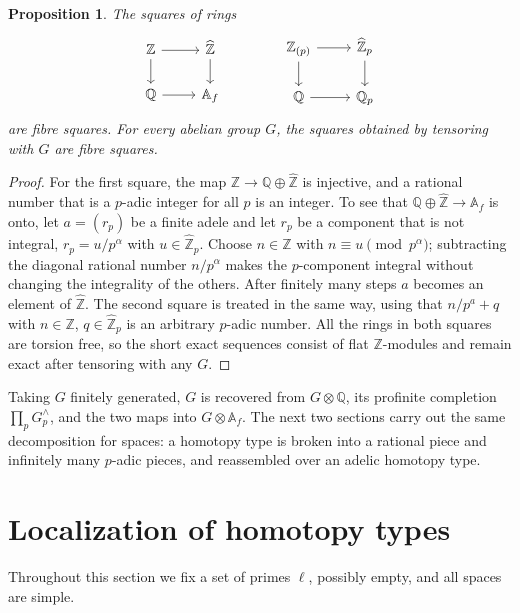 \documentclass[11pt]{amsart}
\theoremstyle{plain}
\newtheorem{proposition}[theorem]{Proposition}
\theoremstyle{definition}
\numberwithin{equation}{section}
\newcommand{\Z}{\mathbb{Z}}
\newcommand{\Q}{\mathbb{Q}}
\newcommand{\Zhat}{\widehat{\mathbb{Z}}}
\newcommand{\Af}{\mathbb{A}_f}
\newcommand{\Zp}{\mathbb{Z}_{(p)}}
\begin{document}
\begin{proposition}\label{prop:arithsquare}
The squares of rings
\[
\begin{tikzcd}
\Z\arrow[r]\arrow[d] & \Zhat\arrow[d]\\
\Q\arrow[r] & \Af
\end{tikzcd}
\qquad\qquad
\begin{tikzcd}
\Zp\arrow[r]\arrow[d] & \Zhat_p\arrow[d]\\
\Q\arrow[r] & \Q_p
\end{tikzcd}
\]
are fibre squares.
For every abelian group $G$, the squares obtained by tensoring with $G$ are fibre squares.
\end{proposition}

\begin{proof}
For the first square, the map $\Z\to\Q\oplus\Zhat$ is injective, and a rational number that is a $p$-adic integer for all $p$ is an integer.
To see that $\Q\oplus\Zhat\to\Af$ is onto, let $a=(r_p)$ be a finite adele and let $r_p$ be a component that is not integral, $r_p=u/p^\alpha$ with $u\in\Zhat_p$.
Choose $n\in\Z$ with $n\equiv u\pmod{p^\alpha}$; subtracting the diagonal rational number $n/p^\alpha$ makes the $p$-component integral without changing the integrality of the others.
After finitely many steps $a$ becomes an element of $\Zhat$.
The second square is treated in the same way, using that $n/p^a+q$ with $n\in\Z$, $q\in\Zhat_p$ is an arbitrary $p$-adic number.
All the rings in both squares are torsion free, so the short exact sequences consist of flat $\Z$-modules and remain exact after tensoring with any $G$.
\end{proof}

Taking $G$ finitely generated, $G$ is recovered from $G\otimes\Q$, its profinite completion $\prod_pG^\wedge_p$, and the two maps into $G\otimes\Af$.
The next two sections carry out the same decomposition for spaces: a homotopy type is broken into a rational piece and infinitely many $p$-adic pieces, and reassembled over an adelic homotopy type.


\section{Localization of homotopy types}\label{sec:localization}

Throughout this section we fix a set of primes $\ell$, possibly empty, and all spaces are simple.
\end{document}
